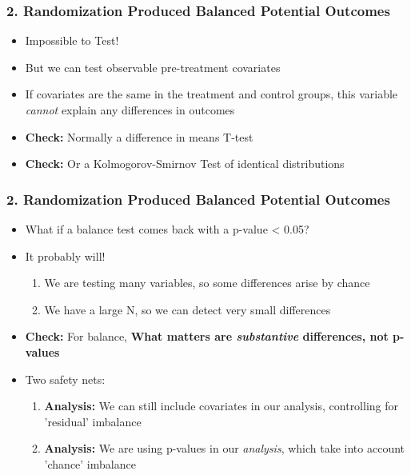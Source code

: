 \documentclass[xcolor=x11names,compress]{beamer}\usepackage[]{graphicx}\usepackage[]{color}
\renewcommand{\(}{\begin{columns}}
\renewcommand{\)}{\end{columns}}
\newcommand{\<}[1]{\begin{column}{#1}}
\renewcommand{\>}{\end{column}}
\begin{document}
\begin{frame}
\frametitle{2. Randomization Produced Balanced Potential Outcomes}
\begin{itemize}
\item Impossible to Test!
\pause
\item But we can test observable pre-treatment covariates
\pause
\item If covariates are the same in the treatment and control groups, this variable \textit{cannot} explain any differences in outcomes
\pause
\item \textbf{Check:} Normally a difference in means T-test
\pause
\item \textbf{Check:} Or a Kolmogorov-Smirnov Test of identical distributions
\end{itemize}
\end{frame}

\begin{frame}
\frametitle{2. Randomization Produced Balanced Potential Outcomes}
\begin{itemize}
\item What if a balance test comes back with a p-value < 0.05?
\pause
\item It probably will!
\begin{enumerate}
\item We are testing many variables, so some differences arise by chance
\pause
\item We have a large N, so we can detect very small differences
\pause
\end{enumerate}
\item \textbf{Check:} For balance, \textbf{What matters are \textit{substantive} differences, not p-values}
\pause
\item Two safety nets:
\begin{enumerate}
\item \textbf{Analysis:} We can still include covariates in our analysis, controlling for 'residual' imbalance
\pause
\item \textbf{Analysis:} We are using p-values in our \textit{analysis}, which take into account 'chance' imbalance
\pause
\end{enumerate}
\end{itemize}
\end{frame}
\end{document}
